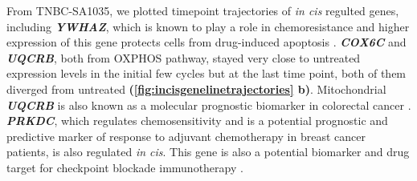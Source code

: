 From TNBC-SA1035, we plotted timepoint trajectories of \textit{in cis} regulted genes, including \textit{\textbf{YWHAZ}}, which is known to play a role in chemoresistance and higher expression of this gene protects cells from drug-induced apoptosis \cite{li2010amplification}.
\textit{\textbf{COX6C}} and \textit{\textbf{UQCRB}}, both from \ac{OXPHOS} pathway, stayed very close to untreated expression levels in the initial few cycles but at the last time point, both of them diverged from untreated \textbf{(\autoref{fig:incisgenelinetrajectories} b)}.
Mitochondrial \textit{\textbf{UQCRB}} is also known as a molecular prognostic biomarker in colorectal cancer \cite{kim2017mitochondrial}.
\textit{\textbf{PRKDC}}, which regulates chemosensitivity and is a potential prognostic and predictive marker of response to adjuvant chemotherapy in breast cancer patients, is also regulated \textit{in cis}. This gene is also a potential biomarker and drug target for checkpoint blockade immunotherapy \cite{tan2020prkdc, sun2017prkdc, zhang2019prkdc}.





